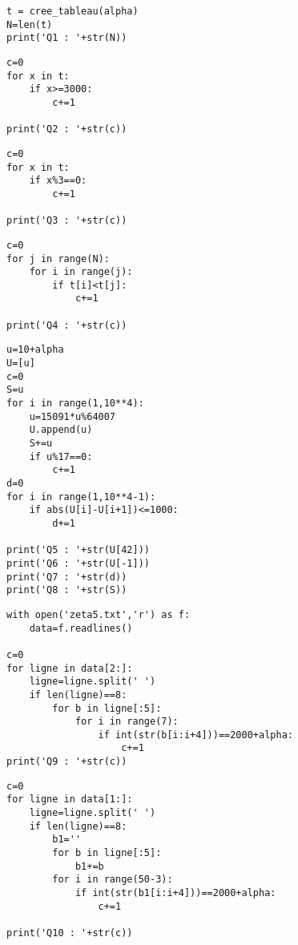 


\question{
}

\begin{lstlisting}
t = cree_tableau(alpha)
N=len(t)
print('Q1 : '+str(N))
\end{lstlisting}

\question{
}

\begin{lstlisting}
c=0
for x in t:
    if x>=3000:
        c+=1
        
print('Q2 : '+str(c))
\end{lstlisting}


\question{
}

\begin{lstlisting}
c=0
for x in t:
    if x%3==0:
        c+=1
        
print('Q3 : '+str(c))
\end{lstlisting}

\question{
}

\begin{lstlisting}
c=0
for j in range(N):
    for i in range(j):
        if t[i]<t[j]:
            c+=1
            
print('Q4 : '+str(c))
\end{lstlisting}

\question{
}
\question{
}
\question{
}
\question{
}


\begin{lstlisting}
u=10+alpha
U=[u]
c=0
S=u
for i in range(1,10**4):
    u=15091*u%64007
    U.append(u)
    S+=u
    if u%17==0:
        c+=1
d=0
for i in range(1,10**4-1):
    if abs(U[i]-U[i+1])<=1000:
        d+=1
        
print('Q5 : '+str(U[42]))
print('Q6 : '+str(U[-1]))
print('Q7 : '+str(d))
print('Q8 : '+str(S))
\end{lstlisting}

\question{
}

\begin{lstlisting}
with open('zeta5.txt','r') as f:
    data=f.readlines()

c=0
for ligne in data[2:]:
    ligne=ligne.split(' ')
    if len(ligne)==8:
        for b in ligne[:5]:
            for i in range(7):
                if int(str(b[i:i+4]))==2000+alpha:
                    c+=1
print('Q9 : '+str(c))
\end{lstlisting}

\question{
}

\begin{lstlisting}
c=0
for ligne in data[1:]:
    ligne=ligne.split(' ')
    if len(ligne)==8:
        b1=''
        for b in ligne[:5]:
            b1+=b
        for i in range(50-3):
            if int(str(b1[i:i+4]))==2000+alpha:
                c+=1

print('Q10 : '+str(c))
\end{lstlisting}

